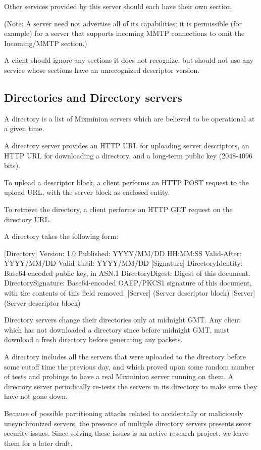 Other services provided by this server should each have their own section.

(Note: A server need not advertise all of its capabilities; it is
permissible (for example) for a server that supports incoming MMTP
connections to omit the Incoming/MMTP section.)

A client should ignore any sections it does not recognize, but should
not use any service whose sections have an unrecognized descriptor
version.

\subsection{Directories and Directory servers}

A directory is a list of Mixminion servers which are believed to
be operational at a given time.

A directory server provides an HTTP URL for uploading server
descriptors, an HTTP URL for downloading a directory, and a long-term
public key (2048-4096 bits).

To upload a descriptor block, a client performs an HTTP POST request
to the upload URL, with the server block as enclosed entity.

To retrieve the directory, a client performs an HTTP GET request on
the directory URL.

A directory takes the following form:

 [Directory]
 Version: 1.0
 Published: YYYY/MM/DD HH:MM:SS
 Valid-After: YYYY/MM/DD
 Valid-Until: YYYY/MM/DD
 [Signature]
 DirectoryIdentity: Base64-encoded public key, in ASN.1
 DirectoryDigest: Digest of this document.
 DirectorySignature: Base64-encoded OAEP/PKCS1 signature of this document, with
     the contents of this field removed.
 [Server]
     (Server descriptor block)
 [Server]
     (Server descriptor block)

Directory servers change their directories only at midnight GMT.  Any
client which has not downloaded a directory since before midnight GMT,
must download a fresh directory before generating any packets.

A directory includes all the servers that were uploaded to the
directory before some cutoff time the previous day, and which proved
upon some random number of tests and probings to have a real Mixminion
server running on them.  A directory server periodically re-tests
the servers in its directory to make sure they have not gone down.

Because of possible partitioning attacks related to accidentally or
maliciously unsynchronized servers, the presence of multiple directory
servers presents sever security issues.  Since solving these issues is
an active research project, we leave them for a later draft.

